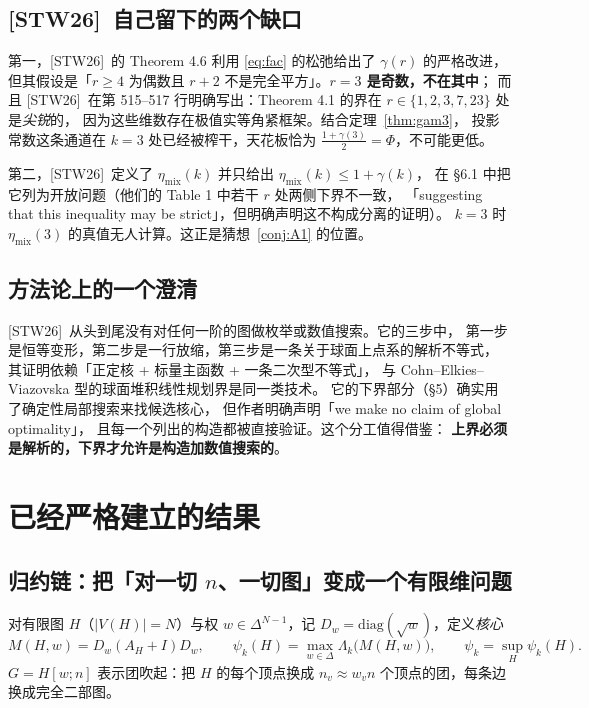 \documentclass[UTF8,11pt]{ctexart}
\theoremstyle{definition}
\newcommand{\Lam}{\Lambda}
\newcommand{\STW}{\textup{[STW26]}}
\begin{document}
\subsection{\STW\ 自己留下的两个缺口}

第一，\STW\ 的 Theorem 4.6 利用 \eqref{eq:fac} 的松弛给出了 $\gamma(r)$ 的严格改进，
但其假设是「$r\ge4$ 为偶数且 $r+2$ 不是完全平方」。\textbf{$r=3$ 是奇数，不在其中}；
而且 \STW\ 在第 515--517 行明确写出：Theorem 4.1 的界在 $r\in\{1,2,3,7,23\}$ 处是\emph{尖锐}的，
因为这些维数存在极值实等角紧框架。结合定理~\ref{thm:gam3}，
投影常数这条通道在 $k=3$ 处已经被榨干，天花板恰为 $\frac{1+\gamma(3)}2=\Phi$，不可能更低。

第二，\STW\ 定义了 $\eta_{\mathrm{mix}}(k)$ 并只给出 $\eta_{\mathrm{mix}}(k)\le1+\gamma(k)$，
在 \S6.1 中把它列为开放问题（他们的 Table 1 中若干 $r$ 处两侧下界不一致，
「suggesting that this inequality may be strict」，但明确声明这不构成分离的证明）。
$k=3$ 时 $\eta_{\mathrm{mix}}(3)$ 的真值无人计算。这正是猜想~\ref{conj:A1} 的位置。

\subsection{方法论上的一个澄清}

\STW\ 从头到尾没有对任何一阶的图做枚举或数值搜索。它的三步中，
第一步是恒等变形，第二步是一行放缩，第三步是一条关于球面上点系的解析不等式，
其证明依赖「正定核 + 标量主函数 + 一条二次型不等式」，
与 Cohn--Elkies--Viazovska 型的球面堆积线性规划界是同一类技术。
它的下界部分（\S5）确实用了确定性局部搜索来找候选核心，
但作者明确声明「we make no claim of global optimality」，
且每一个列出的构造都被直接验证。这个分工值得借鉴：
\textbf{上界必须是解析的，下界才允许是构造加数值搜索的}。

\section{已经严格建立的结果}

\subsection{归约链：把「对一切 $n$、一切图」变成一个有限维问题}

对有限图 $H$（$|V(H)|=N$）与权 $w\in\Delta^{N-1}$，记 $D_w=\mathrm{diag}(\sqrt w)$，定义\emph{核心}
\[
M(H,w)=D_w(A_H+I)D_w,\qquad
\psi_k(H)=\max_{w\in\Delta}\Lam_k\bigl(M(H,w)\bigr),\qquad
\psi_k=\sup_H\psi_k(H).
\]
$G=H[w;n]$ 表示团吹起：把 $H$ 的每个顶点换成 $n_v\approx w_vn$ 个顶点的团，每条边换成完全二部图。
\end{document}
